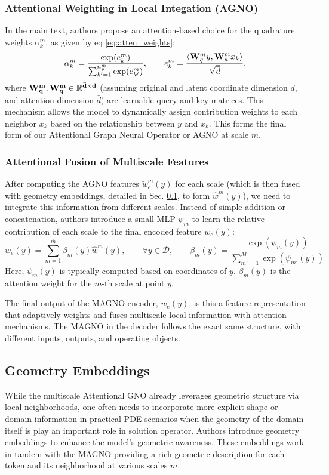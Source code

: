 \documentclass[reqno,10pt]{amsart}
\theoremstyle{plain}
\theoremstyle{definition}
\newcommand{\bb}[1]{\mathbb{#1}}
\newcommand{\cal}[1]{\mathcal{#1}}
\begin{document}
\subsubsection{\bf Attentional Weighting in Local Integation (AGNO)}
In the main text, authors propose an attention-based choice for the quadrature weights $\alpha_k^m$, as given by eq \ref{eq:atten_weights}:
\begin{equation}
    \alpha_k^m = \frac{\exp(e^m_k)}{\sum_{k'=1}^{n_y^m} \exp(e^m_{k'})}, \qquad e^m_k = \frac{\langle {\bf W}_q^m y,{\bf W}_\kappa^m x_k \rangle}{\sqrt{\overline{d}}},
\end{equation}
where $\bf W^m_q, \bf W^m_q \in \bb R^{\bar{d}\times d}$ (assuming original and latent coordinate dimension $d$, and attention dimension $\bar{d}$) are learnable query and key matrices. This mechanism allows the model to dynamically assign contribution weights to each neighbor $x_k$ based on the relationship between $y$ and $x_k$. This forms the final form of our Attentional Graph Neural Operator or AGNO at scale $m$.

\subsubsection{\bf Attentional Fusion of Multiscale Features}
After computing the AGNO features $\tilde{w}_e^m(y)$ for each scale (which is then fused with geometry embeddings, detailed in Sec. \ref{appendix:gembedd}, to form $\hat{w}^m(y)$), we need to integrate this information from different scales. Instead of simple addition or concatenation, authors introduce a small MLP $\psi_m$ to learn the relative contribution of each scale to the final encoded feature $w_e(y)$:
\begin{equation}
    w_e(y) = \sum_{m=1}^{\bar{m}} \beta_m(y) \hat{w}^m(y), \qquad \forall y \in \cal D, \qquad \beta_m(y) = \frac{\exp(\psi_m(y))}{\sum_{m'=1}^{M}\exp(\psi_{m'}(y))}
\end{equation}
Here, $\psi_m(y)$ is typically computed based on coordinates of $y$. $\beta_m(y)$ is the attention weight for the $m$-th scale at point $y$. 

\noindent The final output of the MAGNO encoder, $w_e(y)$, is this a feature representation that adaptively weights and fuses multiscale local information with attention mechanisms. The MAGNO in the decoder follows the exact same structure, with different inputs, outputs, and operating objects.

\subsection{\bf Geometry Embeddings} \label{appendix:gembedd}
While the multiscale Attentional GNO already leverages geometric structure via local neighborhoods, one often needs to incorporate more explicit shape or domain information in practical PDE scenarios when the geometry of the domain itself is play an important role in solution operator. Authors introduce geometry embeddings to enhance the model's geometric awareness. These embeddings work in tandem with the MAGNO providing a rich geometric description for each token and its neighborhood at various scales $m$.
\end{document}
